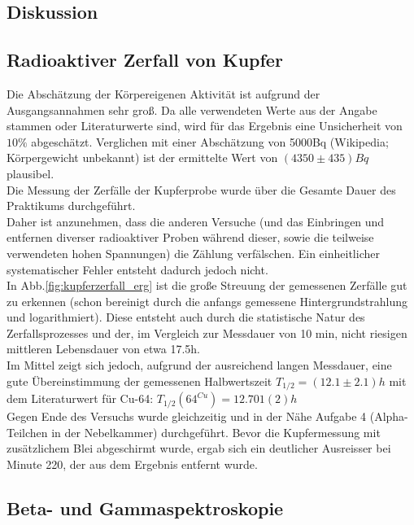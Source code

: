 \documentclass[12pt,a4paper]{article}
\begin{document}
\begin{multicols}{2}
\pagebreak
\section{Diskussion}

\subsection{Radioaktiver Zerfall von Kupfer}
Die Abschätzung der Körpereigenen Aktivität ist aufgrund der Ausgangsannahmen sehr groß. Da alle verwendeten Werte aus der Angabe stammen oder Literaturwerte sind, wird für das Ergebnis eine Unsicherheit von $10\%$ abgeschätzt. Verglichen mit einer Abschätzung von 5000Bq (Wikipedia; Körpergewicht unbekannt) ist der ermittelte Wert von $(4350 \pm 435) Bq$ plausibel.\\

\noindent Die Messung der Zerfälle der Kupferprobe wurde über die Gesamte Dauer des Praktikums durchgeführt.\\
Daher ist anzunehmen, dass die anderen Versuche (und das Einbringen und entfernen diverser radioaktiver Proben während dieser, sowie die teilweise verwendeten hohen Spannungen) die Zählung verfälschen. Ein einheitlicher systematischer Fehler entsteht dadurch jedoch nicht.\\

\noindent In Abb.\ref{fig:kupferzerfall_erg} ist die große Streuung der gemessenen Zerfälle gut zu erkennen (schon bereinigt durch die anfangs gemessene Hintergrundstrahlung und logarithmiert). Diese entsteht auch durch die statistische Natur des Zerfallsprozesses und der, im Vergleich zur Messdauer von 10 min, nicht riesigen mittleren Lebensdauer von etwa 17.5h.\\

\noindent Im Mittel zeigt sich jedoch, aufgrund der ausreichend langen Messdauer, eine gute Übereinstimmung der gemessenen Halbwertszeit $T_{1/2} = (12.1 \pm 2.1)h$ mit dem
Literaturwert für Cu-64: $T_{1/2} ({64}^{Cu}) = 12.701(2) h$\\

\noindent Gegen Ende des Versuchs wurde gleichzeitig und in der Nähe Aufgabe 4 (Alpha-Teilchen in der Nebelkammer) durchgeführt. Bevor die Kupfermessung mit zusätzlichem Blei abgeschirmt wurde, ergab sich ein deutlicher Ausreisser bei Minute 220, der aus dem Ergebnis entfernt wurde.

\subsection{Beta- und Gammaspektroskopie}


\end{multicols}
\end{document}
